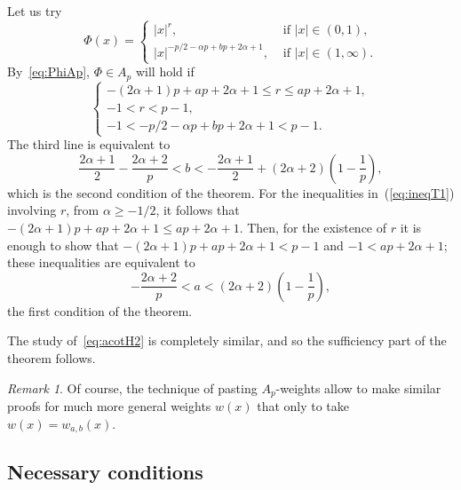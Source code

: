 \documentclass[a4paper]{amsart}
\theoremstyle{plain}
\theoremstyle{remark}
\newtheorem*{remark}{Remark}
\begin{document}
Let us try
\begin{equation*}
  \Phi(x) = \begin{cases}
    |x|^r, &{\text{ if }} |x| \in (0,1), \\
    |x|^{-p/2 - \alpha p + bp + 2\alpha+1}, &{\text{ if }} |x| \in (1,\infty).
  \end{cases}
\end{equation*}
By~\eqref{eq:PhiAp}, $\Phi \in A_p$ will hold if
\begin{equation}
\label{eq:ineqT1}
  \begin{cases}
    -(2\alpha+1)p + ap + 2\alpha+1 \le r \le ap + 2\alpha+1, \\
    -1 < r < p - 1, \\
    -1 < -p/2 - \alpha p + bp + 2\alpha+1 < p - 1.
  \end{cases}
\end{equation}
The third line is equivalent to
\begin{equation*}
  \frac{2\alpha+1}{2} - \frac{2\alpha+2}{p}
    < b < -\frac{2\alpha+1}{2} + (2\alpha+2)\left(1-\frac1p\right),
\end{equation*}
which is the second condition of the theorem.
For the inequalities in~(\ref{eq:ineqT1}) involving $r$, from $\alpha \ge -1/2$, it follows that $-(2\alpha+1)p + ap + 2\alpha+1 \le ap + 2\alpha+1$. Then, for the existence of $r$ it is enough to show that $-(2\alpha+1)p + ap + 2\alpha+1 < p-1$ and $-1 < ap + 2\alpha+1$; these inequalities are equivalent to
\begin{equation*}
  - \frac{2\alpha+2}{p} < a < (2\alpha+2)\left(1-\frac1p\right),
\end{equation*}
the first condition of the theorem.

The study of~\eqref{eq:acotH2} is completely similar, and so the sufficiency part of the theorem follows.

\begin{remark}
Of course, the technique of pasting $A_p$-weights \cite{Per} allow to make similar proofs for much more general weights $w(x)$ that only to take $w(x) = w_{a,b}(x)$.
\end{remark}

\subsection{Necessary conditions}
\end{document}
